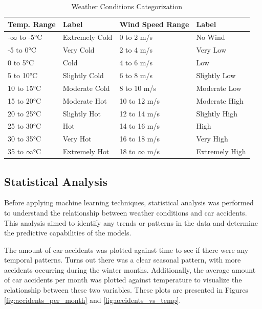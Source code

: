 \documentclass{article}
\begin{document}
\begin{table}[!ht]
    \centering
    \caption{Weather Conditions Categorization} \label{table:weather_conditions}
    \begin{tabular}{ll|ll}
        \hline
        Temp. Range       & Label          & Wind Speed Range   & Label          \\ \hline
        -$\infty$ to -5°C & Extremely Cold & 0 to 2 m/s         & No Wind        \\
        -5 to 0°C         & Very Cold      & 2 to 4 m/s         & Very Low       \\
        0 to 5°C          & Cold           & 4 to 6 m/s         & Low            \\
        5 to 10°C         & Slightly Cold  & 6 to 8 m/s         & Slightly Low   \\
        10 to 15°C        & Moderate Cold  & 8 to 10 m/s        & Moderate Low   \\
        15 to 20°C        & Moderate Hot   & 10 to 12 m/s       & Moderate High  \\
        20 to 25°C        & Slightly Hot   & 12 to 14 m/s       & Slightly High  \\
        25 to 30°C        & Hot            & 14 to 16 m/s       & High           \\
        30 to 35°C        & Very Hot       & 16 to 18 m/s       & Very High      \\
        35 to $\infty$°C  & Extremely Hot  & 18 to $\infty$ m/s & Extremely High \\ \hline
    \end{tabular}
\end{table}

\subsection{Statistical Analysis}

Before applying machine learning techniques, statistical analysis was performed to understand the relationship between weather conditions and car accidents. This analysis aimed to identify any trends or patterns in the data and determine the predictive capabilities of the models.

The amount of car accidents was plotted against time to see if there were any temporal patterns. Turns out there was a clear seasonal pattern, with more accidents occurring during the winter months. Additionally, the average amount of car accidents per month was plotted against temperature to visualize the relationship between these two variables. These plots are presented in Figures \ref{fig:accidents_per_month} and \ref{fig:accidents_vs_temp}.
\end{document}
